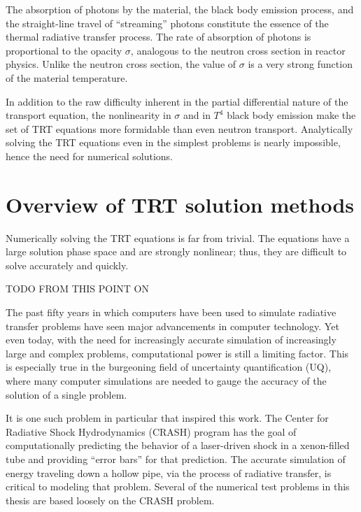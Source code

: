 The absorption of photons by the material, the black body emission process, and
the straight-line travel of ``streaming'' photons constitute the essence of the
thermal radiative transfer process. The rate of absorption of photons is
proportional to the opacity $\sigma$, analogous to the neutron cross section in
reactor physics. Unlike the neutron cross section, the value of $\sigma$ is
a very strong function of the material temperature.

In addition to the raw difficulty inherent in the partial differential
nature of the transport equation, the nonlinearity in $\sigma$ and in $T^4$
black body emission make the set of TRT equations more formidable than even
neutron transport. Analytically solving the TRT equations even in the
simplest problems is nearly impossible, hence the need for numerical solutions.

\section{Overview of TRT solution methods}

Numerically solving the TRT equations is far from trivial.  The equations have
a large solution phase space and are strongly nonlinear; thus,
they are difficult to solve accurately and quickly.

TODO FROM THIS POINT ON

The past fifty years in which computers have been used to simulate radiative
transfer problems \cite{Cam1964,Cam1969} have seen major
advancements in computer technology.
Yet even today, with the need for increasingly accurate simulation of
increasingly
large and complex problems, computational power is still a limiting factor.
This is especially true in the burgeoning field of uncertainty quantification
(UQ), where many computer simulations are needed to gauge the
accuracy of the solution of a single problem.

It is one such problem in particular that inspired this work. The Center for
Radiative Shock Hydrodynamics (CRASH) program \cite{Crash2010} has the goal of
computationally predicting the behavior of a laser-driven shock in a
xenon-filled tube and providing ``error bars'' for that prediction. The accurate
simulation of energy traveling down a hollow pipe, via the process of
radiative transfer, is critical to modeling that problem. Several of the
numerical test problems in this thesis are based loosely on the CRASH problem.

